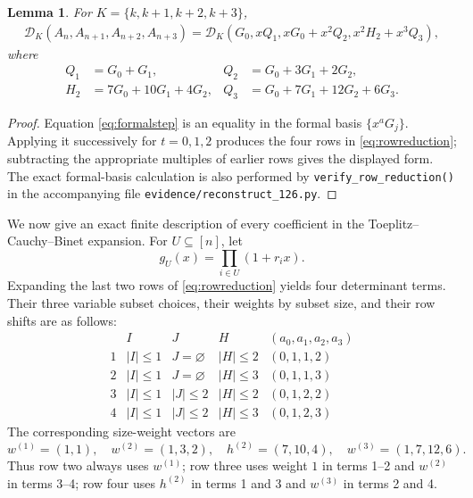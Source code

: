 \documentclass[11pt]{article}
\newtheorem{lemma}[theorem]{Lemma}
\newcommand{\cD}{\mathcal{D}}
\begin{document}
\begin{lemma}\label{lem:rowreduction}
For $K=\{k,k+1,k+2,k+3\}$,
\begin{align}
 \cD_K(A_n,A_{n+1},A_{n+2},A_{n+3})
 =\cD_K(G_0,xQ_1,xG_0+x^2Q_2,x^2H_2+x^3Q_3),\label{eq:rowreduction}
\end{align}
where
\[
 \begin{aligned}
 Q_1&=G_0+G_1,&
 Q_2&=G_0+3G_1+2G_2,\\
 H_2&=7G_0+10G_1+4G_2,&
 Q_3&=G_0+7G_1+12G_2+6G_3.
 \end{aligned}
\]
\end{lemma}

\begin{proof}
Equation \eqref{eq:formalstep} is an equality in the formal basis
$\{x^aG_j\}$.  Applying it successively for $t=0,1,2$ produces the four
rows in \eqref{eq:rowreduction}; subtracting the appropriate multiples of
earlier rows gives the displayed form.  The exact formal-basis calculation is
also performed by \texttt{verify\_row\_reduction()} in the accompanying file
\texttt{evidence/reconstruct\_126.py}.
\end{proof}

We now give an exact finite description of every coefficient in the
Toeplitz--Cauchy--Binet expansion.  For $U\subseteq[n]$, let
\[
 g_U(x)=\prod_{i\in U}(1+r_i x).
\]
Expanding the last two rows of \eqref{eq:rowreduction} yields four determinant
terms.  Their three variable subset choices, their weights by subset size, and
their row shifts are as follows:
\[
\begin{array}{c|c|c|c|c}
 &I&J&H&(a_0,a_1,a_2,a_3)\\ \hline
1& |I|\leq1&J=\varnothing&|H|\leq2&(0,1,1,2)\\
2& |I|\leq1&J=\varnothing&|H|\leq3&(0,1,1,3)\\
3& |I|\leq1&|J|\leq2&|H|\leq2&(0,1,2,2)\\
4& |I|\leq1&|J|\leq2&|H|\leq3&(0,1,2,3)
\end{array}
\]
The corresponding size-weight vectors are
\[
 w^{(1)}=(1,1),\quad w^{(2)}=(1,3,2),\quad
 h^{(2)}=(7,10,4),\quad w^{(3)}=(1,7,12,6).
\]
Thus row two always uses $w^{(1)}$; row three uses weight $1$ in terms
1--2 and $w^{(2)}$ in terms 3--4; row four uses $h^{(2)}$ in terms 1 and 3
and $w^{(3)}$ in terms 2 and 4.
\end{document}
